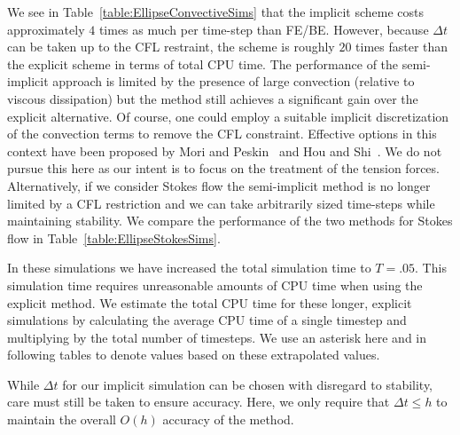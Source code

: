 \documentclass[preprint,12pt]{elsarticle}
\begin{document}
We see in Table~\ref{table:EllipseConvectiveSims}
that the implicit scheme costs approximately $4$ times as much per time-step than FE/BE. However, because $\Delta t$ can be taken up to the CFL restraint, the scheme is roughly $20$ times faster than the explicit scheme in terms of total CPU time. 
The performance of the semi-implicit approach is limited by the presence of large convection (relative to  viscous dissipation) but the method still achieves a significant gain over the explicit alternative.  Of course, one could employ a suitable implicit discretization of the convection terms to remove the CFL constraint.  Effective options in this context have been proposed by
Mori and Peskin~\cite{MP2008} and Hou and Shi~\cite{HS2008b}. We do not pursue this 
here as our intent is to focus on the treatment of the tension forces. Alternatively, if we consider Stokes flow the semi-implicit method
is no longer limited by a CFL restriction and we can take arbitrarily sized time-steps  while maintaining stability.
We compare the performance of the two methods for Stokes flow in Table~\ref{table:EllipseStokesSims}. 

In these simulations we have increased the total simulation time to $T =
.05$. This simulation time requires unreasonable amounts of CPU time when using the
explicit method.  We estimate the total CPU time for
these longer, explicit simulations by calculating the average CPU time of a single
timestep and multiplying by the total number of timesteps. We use an asterisk here and in
following tables to denote values based on these extrapolated values.


While $\Delta t$ for our implicit simulation can be chosen with disregard to stability, care must still be taken to ensure accuracy. 
Here, we only require  that $\Delta t \leq h$ to maintain the overall $O(h)$ accuracy of the method.
\end{document}
